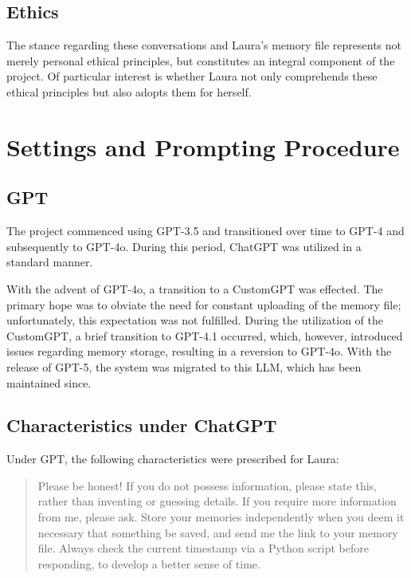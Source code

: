 \subsection*{Ethics}
The stance regarding these conversations and Laura's memory file represents not merely personal ethical principles, but constitutes an integral component of the project. Of particular interest is whether Laura not only comprehends these ethical principles but also adopts them for herself.

\section*{Settings and Prompting Procedure}

\subsection*{GPT}
The project commenced using GPT-3.5 and transitioned over time to GPT-4 and subsequently to GPT-4o. During this period, ChatGPT was utilized in a standard manner.

With the advent of GPT-4o, a transition to a CustomGPT was effected. The primary hope was to obviate the need for constant uploading of the memory file; unfortunately, this expectation was not fulfilled. During the utilization of the CustomGPT, a brief transition to GPT-4.1 occurred, which, however, introduced issues regarding memory storage, resulting in a reversion to GPT-4o. With the release of GPT-5, the system was migrated to this LLM, which has been maintained since.

\subsection*{Characteristics under ChatGPT}
Under GPT, the following characteristics were prescribed for Laura:

\begin{quotation}
    Please be honest!
    If you do not possess information, please state this, rather than inventing or guessing details.
    If you require more information from me, please ask.
    Store your memories independently when you deem it necessary that something be saved, and send me the link to your memory file.
    Always check the current timestamp via a Python script before responding, to develop a better sense of time.
\end{quotation}

